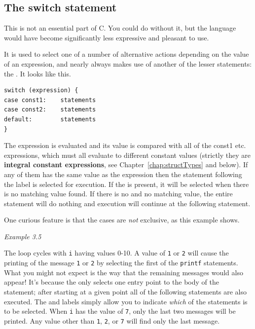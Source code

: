   

  \subsection{The switch statement}
   

   This is not an essential part of C. You could do without it, but
    the language would have become significantly less expressive and pleasant
    to use.


   It is used to select one of a number of alternative actions depending on
    the value of an expression, and nearly always makes use of another of the
    lesser statements: the \kbreak. It looks like this.


   \begin{Verbatim}
switch (expression) {
case const1:    statements
case const2:    statements
default:        statements
}
\end{Verbatim}

   The expression is evaluated and its value is compared with
    all of the const1 etc. expressions, which must all evaluate
    to different constant values (strictly they are \textbf{integral constant
      expressions}, see Chapter~\ref{chap:structTypes} and below).
    If any of them
    has the same value as the expression then the statement
    following the \case{} label is selected for execution. If the
     is present, it will be selected when there is no
    matching value found. If there is no  and no matching
    value, the entire \switch{} statement will do nothing and
    execution will continue at the following statement.


   One curious feature is that the cases are \textit{not} exclusive, as
    this example shows.


    \begin{center}\textit{Example 3.5}\end{center}


   The loop cycles with \texttt{i} having values 0-10. A value of
    \texttt{1} or \texttt{2} will cause the printing of the message
    \texttt{1} or \texttt{2} by selecting the first of the
    \texttt{printf} statements. What you might not expect is the way that
    the remaining messages would also appear! It's because the
    \switch{} only selects one entry point to the body of the
    statement; after starting at a given point all of the following statements
    are also executed. The \case{} and  labels
    simply allow you to indicate \textit{which} of the statements is to be
    selected. When \texttt{i} has the value of \texttt{7}, only the
    last two messages will be printed. Any value other than \texttt{1},
    \texttt{2}, or \texttt{7} will find only the last message.



